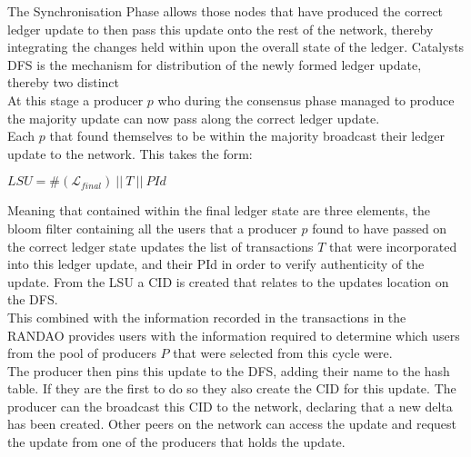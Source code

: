 The Synchronisation Phase allows those nodes that have produced the correct ledger update to then pass this update onto the rest of the network, thereby integrating the changes held within upon the overall state of the ledger. Catalysts DFS is the mechanism for distribution of the newly formed ledger update, thereby two distinct \\

At this stage a producer $p$ who during the consensus phase managed to produce the majority update can now pass along the correct ledger update. \\

Each $p$ that found themselves to be within the majority broadcast their ledger update to the network. This takes the form: 

\begin{center} 
$LSU = \#(\mathcal{L}_{final})~||~T~||~PId$
\end{center} 

Meaning that contained within the final ledger state are three elements, the bloom filter containing all the users that a producer $p$ found to have passed on the correct ledger state updates the list of transactions $T$ that were incorporated into this ledger update, and their PId in order to verify authenticity of the update. From the LSU a CID is created that relates to the updates location on the DFS. \\

This combined with the information recorded in the transactions in the RANDAO provides users with the information required to determine which users from the pool of producers $P$ that were selected from this cycle were. \\

The producer then pins this update to the DFS, adding their name to the hash table. If they are the first to do so they also create the CID for this update. The producer can the broadcast this CID to the network, declaring that a new delta has been created. Other peers on the network can access the update and request the update from one of the producers that holds the update.

